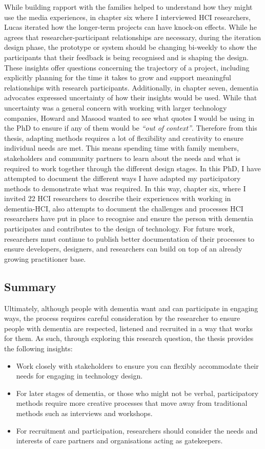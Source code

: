 While building rapport with the families helped to understand how they might use the media experiences, in chapter six where I interviewed HCI researchers, Lucas iterated how the longer-term projects can have knock-on effects. While he agrees that researcher-participant relationships are necessary, during the iteration design phase, the prototype or system should be changing bi-weekly to show the participants that their feedback is being recognised and is shaping the design. These insights offer questions concerning the trajectory of a project, including explicitly planning for the time it takes to grow and support meaningful relationships with research participants. Additionally, in chapter seven, dementia advocates expressed uncertainty of how their insights would be used. While that uncertainty was a general concern with working with larger technology companies, Howard and Masood wanted to see what quotes I would be using in the PhD to ensure if any of them would be \textit{``out of context''}.  
Therefore from this thesis, adapting methods requires a lot of flexibility and creativity to ensure individual needs are met. This means spending time with family members, stakeholders and community partners to learn about the needs and what is required to work together through the different design stages. In this PhD, I have attempted to document the different ways I have adapted my participatory methods to demonstrate what was required. In this way, chapter six, where I invited 22 HCI researchers to describe their experiences with working in dementia-HCI, also attempts to document the challenges and processes HCI researchers have put in place to recognise and ensure the person with dementia participates and contributes to the design of technology. For future work, researchers must continue to publish better documentation of their processes to ensure developers, designers, and researchers can build on top of an already growing practitioner base.

\subsection{Summary}
\label{RQ1:Summary}
Ultimately, although people with dementia want and can participate in engaging ways, the process requires careful consideration by the researcher to ensure people with dementia are respected, listened and recruited in a way that works for them. As such, through exploring this research question, the thesis provides the following insights:

\begin{itemize}
    \item Work closely with stakeholders to ensure you can flexibly accommodate their needs for engaging in technology design.
    \item For later stages of dementia, or those who might not be verbal, participatory methods require more creative processes that move away from traditional methods such as interviews and workshops.
    \item For recruitment and participation, researchers should consider the needs and interests of care partners and organisations acting as gatekeepers.

\end{itemize}

